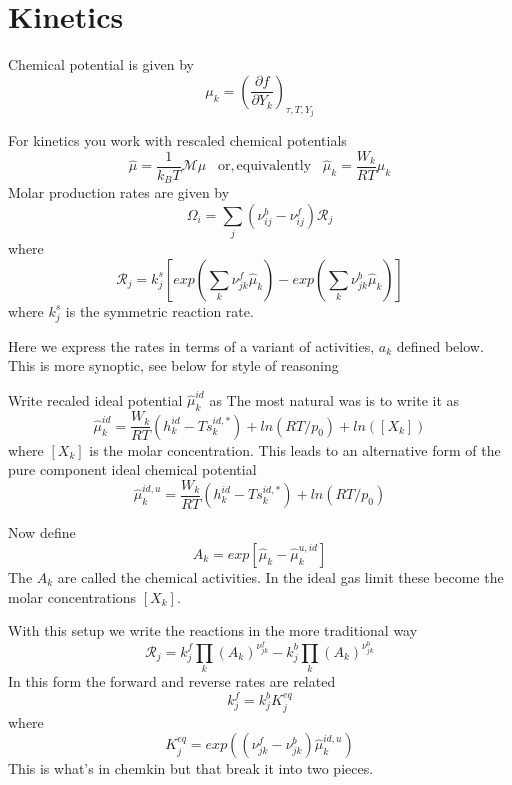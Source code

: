 \documentclass[11pt]{article}
\begin{document}
\section{Kinetics}
\label{sec:kinetics}
Chemical potential is given by
\[
\label{eq:NIpotential}
\mu_k = \left( \frac{\partial f}{\partial Y_k}\right)_{\tau,T,Y_j}
\]

For kinetics you work with rescaled chemical potentials
\[
\hat{\mu} = \frac{1}{k_B T} \mathcal{M} \mu \;\;\;  \mathrm{or, equivalently} \;\;\;  
\hat{\mu}_k = \frac{W_k}{R T} \mu_k
\]
Molar production rates are given by
\[
\Omega_i = \sum_j (\nu_{ij}^b - \nu_{ij}^f) \mathcal{R}_j
\]
where 
\[
\mathcal{R}_j = k_j^s \left [ exp(\sum_k \nu_{jk}^f \hat{\mu}_k) - exp (\sum_k  \nu_{jk}^b \hat{\mu}_k) \right ] 
\]
where $k_j^s$ is the symmetric reaction rate.

Here we express the rates in terms of a variant of activities, $a_k$ defined below.
This is more synoptic, see below for style of reasoning

Write recaled ideal potential  $\hat{\mu}_k^{id}$ as
The most natural was is to write it as
\begin{equation}
\hat{\mu}_k^{id} = \frac{W_k}{R T} (h_k^{id} - T s_k^{id,*} )+ ln(RT/p_0) + ln([X_k])
\end{equation}
where $[X_k]$ is the molar concentration.
This leads to an alternative form of the pure component ideal chemical potential
\begin{equation}
\hat{\mu}_k^{id,u} = \frac{W_k}{R T} (h_k^{id} - T s_k^{id,*} )+ ln(RT/p_0) 
\label{eq:chem_uid_conc}
\end{equation}

Now define
\begin{equation}
A_k = exp[\hat{\mu}_k - \hat{\mu}_k^{u,id}]
\label{eq:deviate_ideal}
\end{equation}
The $A_k$ are called the chemical activities.
In the ideal gas limit these become the molar concentrations $[X_k]$.

With this setup we write the reactions in the more traditional way
\begin{equation}
\mathcal{R}_j = k_j^f \prod_k (A_k)^{\nu_{jk}^f}
- k_j^b \prod_k (A_k)^{\nu_{jk}^b}
\end{equation}
In this form the forward and reverse rates are related
\begin{equation}
 k_j^f = k_j^b K_j^{eq}
\end{equation}
where
\begin{equation}
K_j^{eq} = 
exp( (\nu_{jk}^f - \nu_{jk}^b) \hat{\mu}_k^{id,u})
\label{eq:kin_equil_trad}
\end{equation}
This is what's in chemkin but that break it into two pieces.
\end{document}
